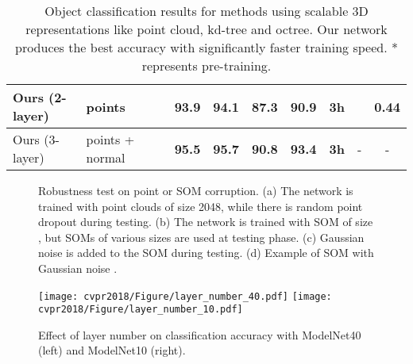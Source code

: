 \documentclass[10pt,twocolumn,letterpaper]{article}
\begin{document}
\begin{table*}[t]
{\begin{tabular}{ll||c|cc|ccc||cc}
Ours (2-layer)          & points                          &                    & 93.9          & 94.1            & 87.3  & 90.9     & 3h            &             & \textbf{0.44}            \\ \hline
Ours (3-layer)          & points + normal                 &                    & \textbf{95.5} & \textbf{95.7}   & \textbf{90.8} & \textbf{93.4}     & \textbf{3h}            & -      & -         \\
\hline
\end{tabular}
}
\caption{Object classification results for methods using scalable 3D representations like point cloud, kd-tree and octree. Our network produces the best accuracy with significantly faster training speed. * represents pre-training.}
\vspace{-4pt}
\label{tbl_cls}
\end{table*}


\begin{figure*}[h!] 
        \centering
        \caption{Robustness test on point or SOM corruption. (a) The network is trained with point clouds of size 2048, while there is random point dropout during testing. (b) The network is trained with SOM of size , but SOMs of various sizes are used at testing phase. (c) Gaussian noise  is added to the SOM during testing. (d) Example of SOM with Gaussian noise .} \label{fig_cls_robustness}
        \vspace{-4pt}
\end{figure*}
\begin{figure}[t] 
        \centering
        \texttt{[image: cvpr2018/Figure/layer\_number\_40.pdf]}
        \texttt{[image: cvpr2018/Figure/layer\_number\_10.pdf]}
        \caption{Effect of layer number on classification accuracy with ModelNet40 (left) and ModelNet10 (right).}
        \label{fig_layer_number}
        \vspace{-12pt}
\end{figure}
\end{document}
